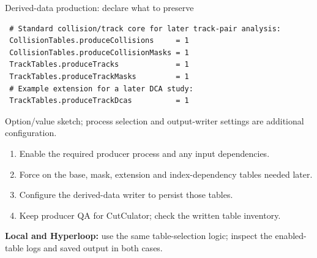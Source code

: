 \begin{frame}[fragile,shrink=8]{Derived-data production: declare what to preserve}
 \begin{lstlisting}
 # Standard collision/track core for later track-pair analysis:
 CollisionTables.produceCollisions     = 1
 CollisionTables.produceCollisionMasks = 1
 TrackTables.produceTracks             = 1
 TrackTables.produceTrackMasks         = 1
 # Example extension for a later DCA study:
 TrackTables.produceTrackDcas          = 1
 \end{lstlisting}
 \small Option/value sketch; process selection and output-writer settings are additional configuration.
 \begin{enumerate}
 \item Enable the required producer process and any input dependencies.
 \item Force on the base, mask, extension and index-dependency tables needed later.
 \item Configure the derived-data writer to persist those tables.
 \item Keep producer QA for CutCulator; check the written table inventory.
 \end{enumerate}
 \textbf{Local and Hyperloop:} use the same table-selection logic; inspect the enabled-table logs and saved output in both cases.
\end{frame}
